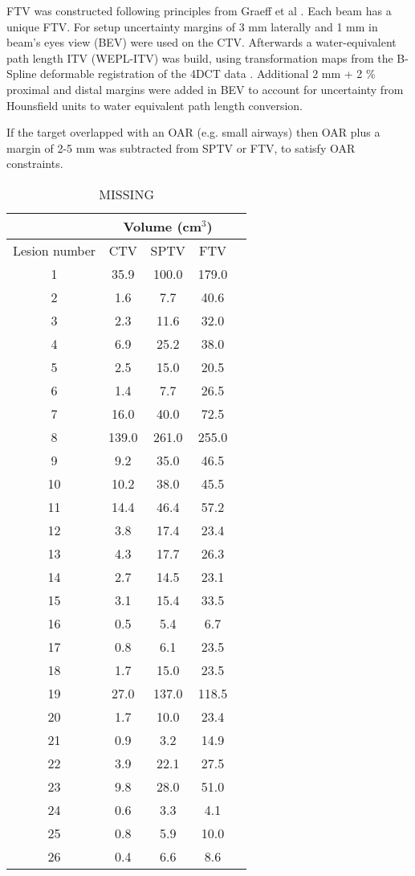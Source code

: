 \documentclass[type=dr, dr=rernat, accentcolor=tud7b,colorbacktitle, bigchapter, openright, twoside, 12pt ]{tudthesis}
\begin{document}
FTV was constructed following principles from Graeff et al \cite{Graeff2012}. Each beam has a unique FTV. For setup uncertainty margins of 3 mm laterally and 1 mm in beam’s eyes view (BEV) were used on the CTV. 
Afterwards a water-equivalent path length ITV (WEPL-ITV) was build, using transformation maps from the B-Spline deformable registration of the 4DCT data \cite{Shackleford2010}. Additional 2 mm + 2 \% proximal and distal margins 
were added in BEV to account for uncertainty from Hounsfield units to water equivalent path length conversion.

If the target overlapped with an OAR (e.g. small airways) then OAR plus a margin of 2-5 mm was subtracted from SPTV or FTV, to satisfy OAR constraints.


\begin{table}[H]
  \centering
  \caption{MISSING}
  \begin{tabular}{|c|c|c|c|c|}
    \hline\hline
     & \multicolumn{3}{|c|}{Volume (cm$^3$)} \\
     \hline
    Lesion number & CTV & SPTV & FTV\\
    \hline
    1 & 35.9 & 100.0 & 179.0  \\
    2 & 1.6 & 7.7 & 40.6 \\
    3 & 2.3 & 11.6 & 32.0 \\
    4 & 6.9 & 25.2 & 38.0 \\
    5 & 2.5 & 15.0 & 20.5 \\
    6 & 1.4 & 7.7 & 26.5 \\
    7 & 16.0 & 40.0 & 72.5 \\
    8 & 139.0 & 261.0 & 255.0 \\
    9 & 9.2 & 35.0 & 46.5 \\
    10 & 10.2 & 38.0 & 45.5 \\
    11 & 14.4 &46.4 & 57.2 \\
    12 & 3.8 & 17.4 & 23.4 \\
    13 & 4.3 & 17.7 & 26.3 \\
    14 & 2.7 & 14.5 & 23.1 \\
    15 & 3.1 & 15.4 & 33.5 \\
    16 & 0.5 & 5.4 & 6.7 \\
    17 & 0.8 & 6.1 & 23.5 \\
    18 & 1.7 & 15.0 & 23.5 \\
    19 & 27.0 & 137.0 & 118.5 \\
    20 & 1.7 & 10.0 & 23.4 \\
    21 & 0.9 & 3.2 & 14.9 \\
    22 & 3.9 & 22.1 & 27.5 \\
    23 & 9.8 & 28.0 & 51.0 \\
    24 & 0.6 & 3.3 & 4.1  \\
    25 & 0.8 & 5.9 & 10.0 \\
    26 & 0.4 & 6.6 & 8.6 \\
    \hline\hline
  \end{tabular}
  \label{tab:patdata}
\end{table}
\end{document}
